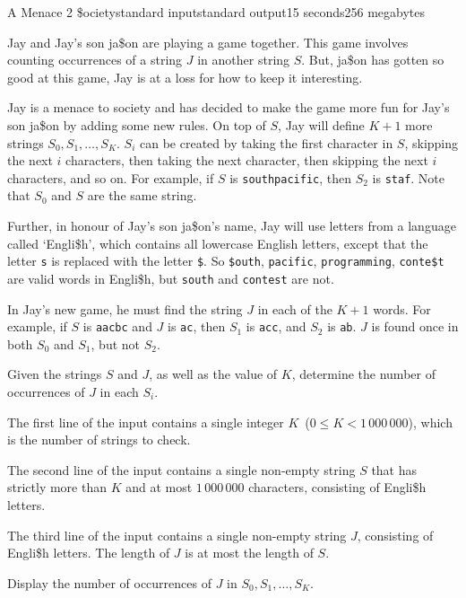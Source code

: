 \begin{problem}{A Menace 2 \$ociety}{standard input}{standard output}{15 seconds}{256 megabytes}

Jay and Jay's son ja\$on are playing a game together. This game involves counting
occurrences of a string $J$ in another string $S$. But, ja\$on has
gotten so good at this game, Jay is at a loss for how to keep it interesting.

Jay is a menace to society and has decided to make the game more fun for Jay's
son ja\$on by adding some new rules. On top of $S$, Jay will define $K + 1$ more strings
$S_0, S_1, \dots, S_K$. $S_i$ can be created by taking the first character in $S$, skipping the next $i$ characters, then taking the next character, then skipping the next $i$ characters, and so on. For example, if $S$ is \texttt{southpacific}, then $S_2$ is \texttt{staf}. Note that $S_0$ and $S$ are the same string.

Further, in honour of Jay's son ja\$on's name, Jay will use letters from a language called `Engli\$h', which contains all lowercase English letters, except that the letter \texttt{s} is replaced with the letter \texttt{\$}. So \texttt{\$outh}, \texttt{pacific}, \texttt{programming}, \texttt{conte\$t} are valid words in Engli\$h, but \texttt{south} and \texttt{contest} are not.

In Jay's new game, he must find the string $J$ in each of the $K+1$ words.
For example, if $S$ is \texttt{aacbc} and $J$ is \texttt{ac}, then $S_1$ is \texttt{acc}, and $S_2$ is \texttt{ab}. $J$ is found once in both $S_0$ and $S_1$, but not $S_2$.

Given the strings $S$ and $J$, as well as the value of $K$, determine the number of occurrences of $J$ in each $S_i$.


\InputFile
The first line of the input contains a single integer $K$~($0 \leq K < 1\,000\,000$),
which is the number of strings to check.

The second line of the input contains a single non-empty string $S$ that has strictly more than $K$ and at most $1\,000\,000$ characters, consisting of Engli\$h letters.

The third line of the input contains a single non-empty string $J$, consisting of Engli\$h letters. The length of $J$ is at most the length of $S$.


\OutputFile
Display the number of occurrences of $J$ in $S_0, S_1, \dots, S_K$.

\Examples

\begin{example}
%
%
%
%
\end{example}

\end{problem}


